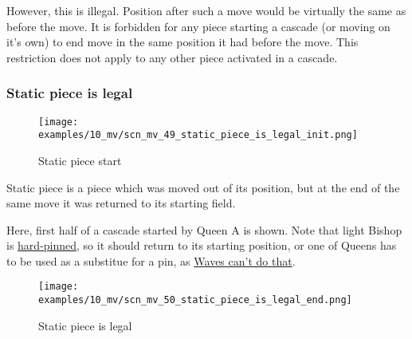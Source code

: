 However, this is illegal. Position after such a move would be virtually the same
as before the move. It is forbidden for any piece starting a cascade (or moving
on it's own) to end move in the same position it had before the move. This
restriction does not apply to any other piece activated in a cascade.

\clearpage %

\subsubsection*{Static piece is legal}
\label{sec:Miranda's veil/Wave/Cascading Waves/Static piece is legal}

\vspace*{-1.4\baselineskip}
\noindent
\begin{figure}[!h]
\texttt{[image: examples/10\_mv/scn\_mv\_49\_static\_piece\_is\_legal\_init.png]}
\vspace*{-1.3\baselineskip}
\caption{Static piece start}
\label{fig:scn_mv_49_static_piece_is_legal_init}
\end{figure}

\vspace*{-0.4\baselineskip}
Static piece is a piece which was moved out of its position, but at the end of the
same move it was returned to its starting field.

Here, first half of a cascade started by Queen A is shown. Note that light Bishop
is \href{https://en.wikipedia.org/wiki/Pin_(chess)#Absolute_pin}{hard-pinned}, so
it should return to its starting position, or one of Queens has to be used as a
substitue for a pin, as
\hyperref[fig:scn_mv_41_pinned_piece_cascaded_init]{Waves can't do that}.

\clearpage %

\vspace*{-2.1\baselineskip}
\noindent
\begin{figure}[!h]
\texttt{[image: examples/10\_mv/scn\_mv\_50\_static\_piece\_is\_legal\_end.png]}
\vspace*{-1.3\baselineskip}
\caption{Static piece is legal}
\label{fig:scn_mv_50_static_piece_is_legal_end}
\end{figure}

